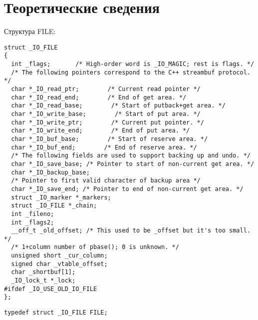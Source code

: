 \chapter{Теоретические сведения}

Структура FILE:
\lstset{language=c}
\begin{lstlisting}[caption=Структура \_IO\_FILE]
struct _IO_FILE
{
  int _flags;       /* High-order word is _IO_MAGIC; rest is flags. */
  /* The following pointers correspond to the C++ streambuf protocol. */
  char *_IO_read_ptr;        /* Current read pointer */
  char *_IO_read_end;        /* End of get area. */
  char *_IO_read_base;        /* Start of putback+get area. */
  char *_IO_write_base;        /* Start of put area. */
  char *_IO_write_ptr;        /* Current put pointer. */
  char *_IO_write_end;        /* End of put area. */
  char *_IO_buf_base;        /* Start of reserve area. */
  char *_IO_buf_end;        /* End of reserve area. */
  /* The following fields are used to support backing up and undo. */
  char *_IO_save_base; /* Pointer to start of non-current get area. */
  char *_IO_backup_base;
  /* Pointer to first valid character of backup area */
  char *_IO_save_end; /* Pointer to end of non-current get area. */
  struct _IO_marker *_markers;
  struct _IO_FILE *_chain;
  int _fileno;
  int _flags2;
  __off_t _old_offset; /* This used to be _offset but it's too small.  */
  /* 1+column number of pbase(); 0 is unknown. */
  unsigned short _cur_column;
  signed char _vtable_offset;
  char _shortbuf[1];
  _IO_lock_t *_lock;
#ifdef _IO_USE_OLD_IO_FILE
};
\end{lstlisting}

\begin{lstlisting}[caption=typedef в файле FILE.h]
typedef struct _IO_FILE FILE;
\end{lstlisting}
